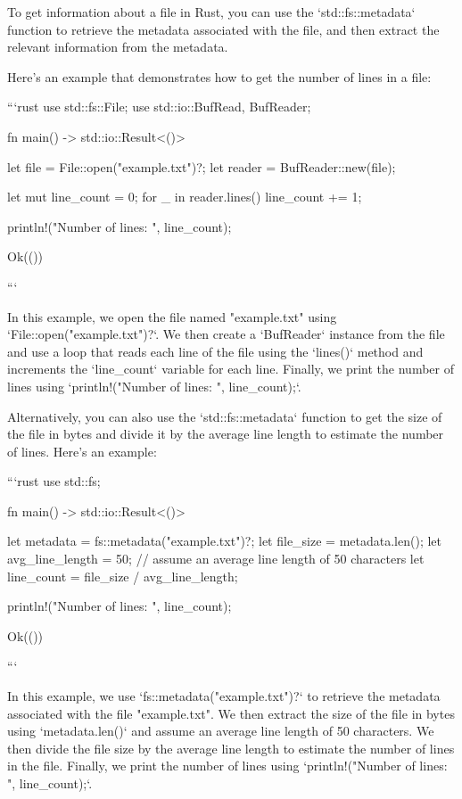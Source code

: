 To get information about a file in Rust, you can use the `std::fs::metadata` function to retrieve the metadata associated with the file, and then extract the relevant information from the metadata.

Here's an example that demonstrates how to get the number of lines in a file:

```rust
use std::fs::File;
use std::io::{BufRead, BufReader};

fn main() -> std::io::Result<()> {
    let file = File::open("example.txt")?;
    let reader = BufReader::new(file);

    let mut line_count = 0;
    for _ in reader.lines() {
        line_count += 1;
    }

    println!("Number of lines: {}", line_count);

    Ok(())
}
```

In this example, we open the file named "example.txt" using `File::open("example.txt")?`. We then create a `BufReader` instance from the file and use a loop that reads each line of the file using the `lines()` method and increments the `line_count` variable for each line. Finally, we print the number of lines using `println!("Number of lines: {}", line_count);`.

Alternatively, you can also use the `std::fs::metadata` function to get the size of the file in bytes and divide it by the average line length to estimate the number of lines. Here's an example:

```rust
use std::fs;

fn main() -> std::io::Result<()> {
    let metadata = fs::metadata("example.txt")?;
    let file_size = metadata.len();
    let avg_line_length = 50; // assume an average line length of 50 characters
    let line_count = file_size / avg_line_length;

    println!("Number of lines: {}", line_count);

    Ok(())
}
```

In this example, we use `fs::metadata("example.txt")?` to retrieve the metadata associated with the file "example.txt". We then extract the size of the file in bytes using `metadata.len()` and assume an average line length of 50 characters. We then divide the file size by the average line length to estimate the number of lines in the file. Finally, we print the number of lines using `println!("Number of lines: {}", line_count);`.
